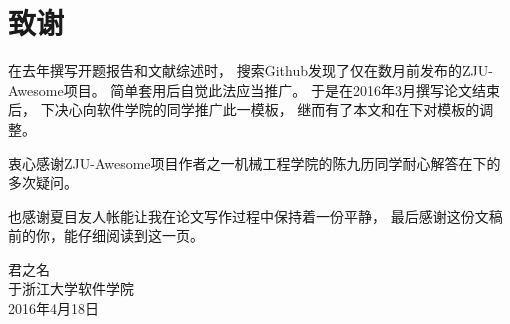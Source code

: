 \chapter{致\ZJUspace{}谢}

在去年撰写开题报告和文献综述时，
搜索Github发现了仅在数月前发布的ZJU-Awesome项目。
简单套用后自觉此法应当推广。
于是在2016年3月撰写论文结束后，
下决心向软件学院的同学推广此一模板，
继而有了本文和在下对模板的调整。

衷心感谢ZJU-Awesome项目作者之一机械工程学院的陈九历同学耐心解答在下的多次疑问。

也感谢夏目友人帐能让我在论文写作过程中保持着一份平静，
最后感谢这份文稿前的你，能仔细阅读到这一页。

\vspace{2cm}
\hfill
\begin{minipage}{14em}
    \begin{flushright}
        君之名\\
        于浙江大学软件学院\\ %
        2016年4月18日   %
    \end{flushright}
\end{minipage}
